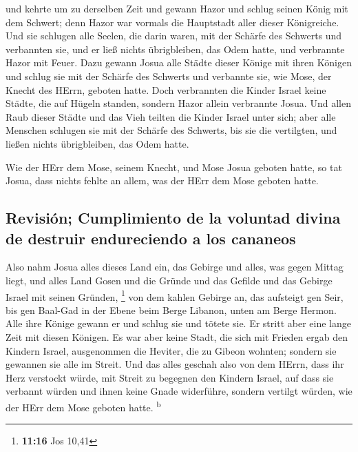  und kehrte um zu derselben Zeit und gewann Hazor und
schlug seinen König mit dem Schwert; denn Hazor war vormals die
Hauptstadt aller dieser Königreiche.  Und sie schlugen
alle Seelen, die darin waren, mit der Schärfe des Schwerts und
verbannten sie, und er ließ nichts übrigbleiben, das Odem hatte, und
verbrannte Hazor mit Feuer.  Dazu gewann Josua alle
Städte dieser Könige mit ihren Königen und schlug sie mit der Schärfe
des Schwerts und verbannte sie, wie Mose, der Knecht des HErrn, geboten
hatte.  Doch verbrannten die Kinder Israel keine Städte,
die auf Hügeln standen, sondern Hazor allein verbrannte Josua.
 Und allen Raub dieser Städte und das Vieh teilten die
Kinder Israel unter sich; aber alle Menschen schlugen sie mit der
Schärfe des Schwerts, bis sie die vertilgten, und ließen nichts
übrigbleiben, das Odem hatte.

 Wie der HErr dem Mose, seinem Knecht, und Mose Josua
geboten hatte, so tat Josua, dass nichts fehlte an allem, was der HErr
dem Mose geboten hatte.

\hypertarget{revisiuxf3n-cumplimiento-de-la-voluntad-divina-de-destruir-endureciendo-a-los-cananeos}{%
\subsection{Revisión; Cumplimiento de la voluntad divina de destruir
endureciendo a los
cananeos}\label{revisiuxf3n-cumplimiento-de-la-voluntad-divina-de-destruir-endureciendo-a-los-cananeos}}

 Also nahm Josua alles dieses Land ein, das Gebirge und
alles, was gegen Mittag liegt, und alles Land Gosen und die Gründe und
das Gefilde und das Gebirge Israel mit seinen Gründen, \footnote{\textbf{11:16}
  Jos 10,41}  von dem kahlen Gebirge an, das aufsteigt
gen Seir, bis gen Baal-Gad in der Ebene beim Berge Libanon, unten am
Berge Hermon. Alle ihre Könige gewann er und schlug sie und tötete sie.
 Er stritt aber eine lange Zeit mit diesen Königen.
 Es war aber keine Stadt, die sich mit Frieden ergab den
Kindern Israel, ausgenommen die Heviter, die zu Gibeon wohnten; sondern
sie gewannen sie alle im Streit.  Und das alles geschah
also von dem HErrn, dass ihr Herz verstockt würde, mit Streit zu
begegnen den Kindern Israel, auf dass sie verbannt würden und ihnen
keine Gnade widerführe, sondern vertilgt würden, wie der HErr dem Mose
geboten hatte. \textsuperscript{b}

